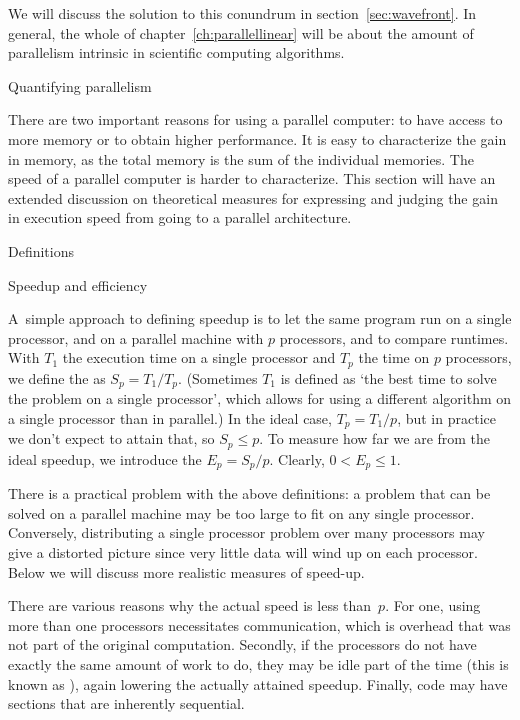 We will discuss the solution to this conundrum in
section~\ref{sec:wavefront}. In general, the whole of
chapter~\ref{ch:parallellinear} will be about the amount of
parallelism intrinsic in scientific computing algorithms.

 {Quantifying parallelism}
\label{sec:speedup-efficiency}

There are two important reasons for using a parallel computer: to have
access to more memory or to obtain higher performance. It is easy to
characterize the gain in memory, as the total memory is the sum of the
individual memories. The speed of a parallel computer is harder to
characterize. This section will have an extended discussion on
theoretical measures for expressing and judging the gain in execution
speed from going to a parallel architecture.

 {Definitions}
\label{sec:speedup}

 {Speedup and efficiency}

A~simple approach to defining speedup is to let the same program run on a
single processor, and on a parallel machine with $p$ processors, and
to compare runtimes.
With $T_1$ the execution time on a single processor and
$T_p$ the time on $p$ processors, we define the  as
$S_p=T_1/T_p$. (Sometimes $T_1$ is defined as `the best time to solve the
problem on a single processor', which allows for using a different
algorithm on a single processor than in parallel.)
In the ideal case, $T_p=T_1/p$, but in practice we don't expect to
attain that, so $S_p\leq p$. To measure how far we are from the ideal
speedup, we introduce the  $E_p=S_p/p$. Clearly,
$0< E_p\leq 1$.

There is a practical problem with
the above definitions: a problem that can be solved on a parallel machine
may be too large to fit on any single processor. Conversely,
distributing a single processor problem
over many processors may give a distorted picture since very little
data will wind up on each processor. Below we will discuss more
realistic measures of speed-up.

There are various reasons why the actual speed is less than~$p$. For
one, using more than one processors necessitates communication, which
is overhead that was not part of the original computation. Secondly,
if the processors do not have exactly the same amount of work to do,
they may be idle part of the time (this is known as
), again lowering the actually attained
speedup. Finally, code may have sections that are inherently
sequential.

